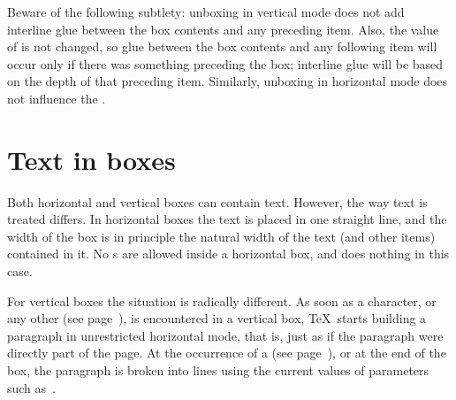 \documentclass{book}
\begin{document}
Beware of the following subtlety: unboxing in vertical
mode does not add interline glue between the box contents and
any preceding item.
Also, the value of  is not
changed, so glue between the box contents and any following
item will  occur only if there was something preceding the box;
interline glue will be based on the depth of that preceding item.
Similarly, unboxing in horizontal mode does not influence
the .

\section{Text in boxes}

Both horizontal and vertical boxes can contain text. However,
the way text is treated differs.
In horizontal boxes
the text is placed in one straight line, and the width of
the box is in principle the natural width of the text
(and other items) contained in it. No s
are allowed inside a horizontal box, and  does
nothing in this case.

For vertical boxes the situation is radically different.
As soon as a character, or any other 
(see page~\pageref{h:com:list}),
is encountered in a vertical box, \TeX\ starts building a paragraph
in unrestricted horizontal mode, that is, just as if the paragraph
were directly part of the page.
At the occurrence of a 
(see page~\pageref{v:com:list}), or at the end
of the box, the paragraph is broken into lines using the
current values of parameters such as~.
\end{document}
